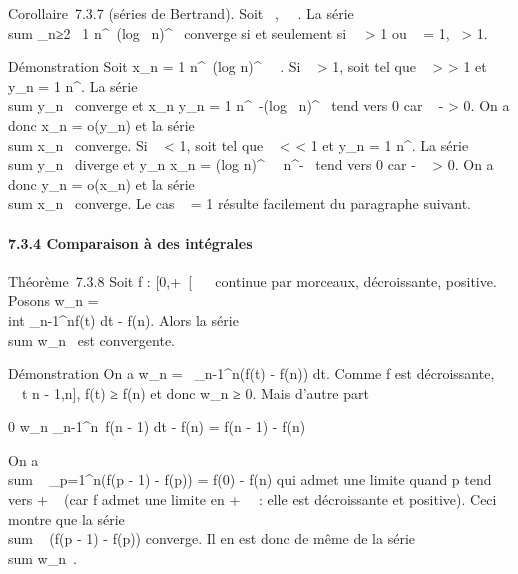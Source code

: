 \documentclass[]{article}
\begin{document}
Corollaire~7.3.7 (séries de Bertrand). Soit \alpha~,\beta~ \in {}~. La série
\\sum  \_n≥2~ 1
\over n^\alpha~(log~
n)^\beta~ converge si et seulement si~\alpha~ \textgreater{} 1 ou \alpha~ =
1,\beta~ \textgreater{} 1.

Démonstration Soit x\_n = 1 \over
n^\alpha~(log n)^\beta~~ . Si \alpha~
\textgreater{} 1, soit \gamma tel que \alpha~ \textgreater{} \gamma \textgreater{} 1 et
y\_n = 1 \over n^\gamma . La série
\\sum  y\_n~
converge et  x\_n \over y\_n = 1
\over n^\alpha~-\gamma(log~
n)^\beta~ tend vers 0 car \alpha~ - \gamma \textgreater{} 0. On a donc
x\_n = o(y\_n) et la série
\\sum  x\_n~
converge. Si \alpha~ \textless{} 1, soit \gamma tel que \alpha~ \textless{} \gamma \textless{}
1 et y\_n = 1 \over n^\gamma . La série
\\sum  y\_n~
diverge et  y\_n \over x\_n =
(log n)^\beta~~ \over
n^\gamma-\alpha~ tend vers 0 car \gamma - \alpha~ \textgreater{} 0. On a donc
y\_n = o(x\_n) et la série
\\sum  x\_n~
converge. Le cas \alpha~ = 1 résulte facilement du paragraphe suivant.

\paragraph{7.3.4 Comparaison à des intégrales}

Théorème~7.3.8 Soit f : {[}0,+\infty~{[}\rightarrow~ ~ continue par morceaux,
décroissante, positive. Posons w\_n =\\int
 \_n-1^nf(t) dt - f(n). Alors la série
\\sum  w\_n~ est
convergente.

Démonstration On a w\_n =\int ~
\_n-1^n(f(t) - f(n)) dt. Comme f est décroissante,
\forall~~t \in {[}n - 1,n{]}, f(t) ≥ f(n) et donc
w\_n ≥ 0. Mais d'autre part

0 \leq w\_n \leq\int  \_n-1^n~f(n
- 1) dt - f(n) = f(n - 1) - f(n)

On a \\sum ~
\_p=1^n(f(p - 1) - f(p)) = f(0) - f(n) qui admet une limite
quand p tend vers + \infty~ (car f admet une limite en + \infty~~: elle est
décroissante et positive). Ceci montre que la série
\\sum ~ (f(p - 1) - f(p))
converge. Il en est donc de même de la série
\\sum  w\_n~.
\end{document}
